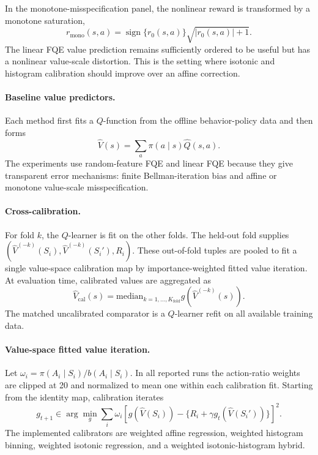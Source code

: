 \documentclass{article}
\theoremstyle{plain}
\theoremstyle{definition}
\theoremstyle{remark}
\begin{document}
In the monotone-misspecification panel, the nonlinear reward is transformed by
a monotone saturation,
\[
  r_{\mathrm{mono}}(s,a)
  =
  \operatorname{sign}\{r_0(s,a)\}\sqrt{|r_0(s,a)|+1}.
\]
The linear FQE value prediction remains sufficiently ordered to be useful but has a
nonlinear value-scale distortion. This is the setting where isotonic and
histogram calibration should improve over an affine correction.

\paragraph{Baseline value predictors.}
Each method first fits a \(Q\)-function from the offline behavior-policy data
and then forms
\[
  \widehat V(s)=\sum_a \pi(a\mid s)\widehat Q(s,a).
\]
The experiments use random-feature FQE and linear FQE because they give
transparent error mechanisms: finite Bellman-iteration bias and affine or
monotone value-scale misspecification.

\paragraph{Cross-calibration.}
For fold \(k\), the \(Q\)-learner is fit on the other folds. The held-out fold
supplies \((\widehat V^{(-k)}(S_i),\widehat V^{(-k)}(S_i'),R_i)\). These
out-of-fold tuples are pooled to fit a single value-space calibration map by
importance-weighted fitted value iteration. At evaluation time, calibrated
values are aggregated as
\[
  \widehat V_{\mathrm{cal}}(s)
  =
  \mathrm{median}_{k=1,\ldots,K_{\mathrm{fold}}}
  g\!\left(\widehat V^{(-k)}(s)\right).
\]
The matched uncalibrated comparator is a \(Q\)-learner refit on all available
training data.

\paragraph{Value-space fitted value iteration.}
Let \(\omega_i=\pi(A_i\mid S_i)/b(A_i\mid S_i)\). In all reported runs the
action-ratio weights are clipped at 20 and normalized to mean one within each
calibration fit. Starting from the identity map, calibration iterates
\[
  g_{t+1}\in\arg\min_g\sum_i \omega_i
  \left[g(\widehat V(S_i))-\{R_i+\gamma g_t(\widehat V(S_i'))\}\right]^2.
\]
The implemented calibrators are weighted affine regression, weighted histogram
binning, weighted isotonic regression, and a weighted isotonic-histogram
hybrid.
\end{document}
